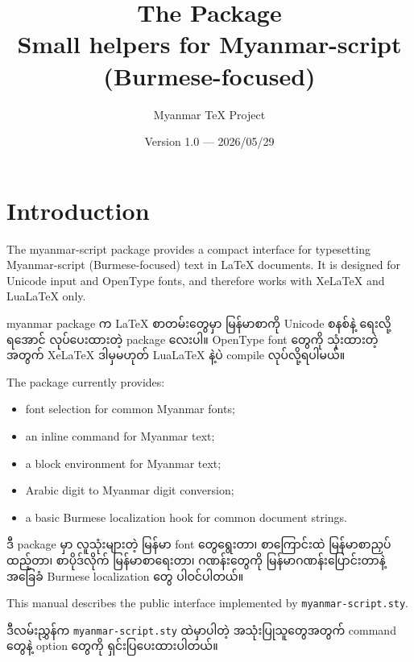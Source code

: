 \documentclass[a4paper,11pt]{article}
\title{\textbf{The \pkg{myanmar-script} Package}\\
Small helpers for Myanmar-script (Burmese-focused)\\[4pt]
\large\textmyanmar{LaTeX အတွက် မြန်မာစာလုံးရေးစနစ် အထောက်အပံ့}}
\author{Myanmar TeX Project}
\date{Version 1.0 --- 2026/05/29}
\newcommand{\pkg}[1]{\textsf{#1}}
\newenvironment{burmese}
  {\par\smallskip\begin{myanmar}\sloppy}
  {\par\end{myanmar}\fussy\smallskip}
\begin{document}
\maketitle

\section{Introduction}

The \pkg{myanmar-script} package provides a compact interface for typesetting
Myanmar-script (Burmese-focused) text in LaTeX documents. It is designed for
Unicode input and OpenType fonts, and therefore works with XeLaTeX and LuaLaTeX only.

\begin{burmese}
\pkg{myanmar} package က LaTeX စာတမ်းတွေမှာ မြန်မာစာကို Unicode စနစ်နဲ့ 
ရေးလို့ရအောင် လုပ်ပေးထားတဲ့ package လေးပါ။ OpenType font တွေကို 
သုံးထားတဲ့အတွက် XeLaTeX ဒါမှမဟုတ် LuaLaTeX နဲ့ပဲ compile လုပ်လို့ရပါမယ်။
\end{burmese}

The package currently provides:

\begin{itemize}
  \item font selection for common Myanmar fonts;
  \item an inline command for Myanmar text;
  \item a block environment for Myanmar text;
  \item Arabic digit to Myanmar digit conversion;
  \item a basic Burmese localization hook for common document strings.
\end{itemize}

\begin{burmese}
ဒီ package မှာ လူသုံးများတဲ့ မြန်မာ font တွေရွေးတာ၊ စာကြောင်းထဲ မြန်မာစာညှပ်ထည့်တာ၊ 
စာပိုဒ်လိုက် မြန်မာစာရေးတာ၊ ဂဏန်းတွေကို မြန်မာဂဏန်းပြောင်းတာနဲ့ အခြေခံ Burmese localization တွေ ပါဝင်ပါတယ်။
\end{burmese}

This manual describes the public interface implemented by
\texttt{myanmar-script.sty}.

\begin{burmese}
ဒီလမ်းညွှန်က \texttt{myanmar-script.sty} ထဲမှာပါတဲ့ အသုံးပြုသူတွေအတွက် command တွေနဲ့ 
option တွေကို ရှင်းပြပေးထားပါတယ်။
\end{burmese}

\end{document}
